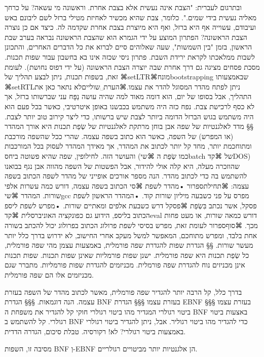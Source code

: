 {ובתרגום לעברית: "הצבת אינה נעשית אלא בצבת אחרת. וראשונה מי עשאה? על כרחך מאליה נעשית בידי שמים.". כלומר, צבת שהיא מכשיר לאחיזת מטילי ברזל לשם ליבונם באש ועיבודם, עשוייה אף היא ברזל, ואף היא מיוצרת בצבת אחרת שקדמה לה. כיצד אם כן נוצרה הצבת הראשונה?
הפתרון המוצע על ידי הגמרא הוא שהצבת הראשונה נבראה בערב שבת הראשון, בזמן "בין השמשות", שעה שאלוהים סיים לברוא את כל הדברים האחרים, והתכונן לשבות ממלאכתו לקראת ירידת השבת. 
פתרון ניסי שכזה אינו בא בחשבון עבור שפות תכנות. מסכת פסחים מציגה גם דרך אחרת שבה יוצרה הצבת הראשונה (על ידי דפוס נחושת). לעומת זאת, בשפות תכנות, ניתן לבצע תהליך של ⌘setLTR{⌘מונח{bootstrapping}} שבאמצעותו ⌘setRTL{ניתן} לפתח מהדר המסוגל להדר את עצמו.⌘הערת␣שוליים{לא נתאר כאן את התהליך, אבל בסופו של יום, הוא דומה מאוד למה שהיה עושה נַפָּח עני שברשותו ברזל, אך לא כסף לרכישת צבת. נפח כזה היה משתמש בכבשנו באופן איטרטיבי, כאשר בכל פעם הוא היה משתמש בגוש הברזל הדומה ביותר לצבת שיש ברשותו, כדי ליצר קירוב טוב יותר לצבת.}
§§ מדד לאלגנטיות של שפה
אבן בוחן מרתקת לאלגנטיות של שְׂפַת תכנות היא אורך המהדר (או המפרש) של השפה, כאשר הוא כתוב בשפה עצמה. שהרי ככל שהשפה מורכבת ומתוחכמת יותר, מחד קל יותר לכתוב את המהדר, אך מאידך המהדר לעסוק בכל המורכבות והעושר הזה. 
לחילופין, שפה שהיא פשוטה ביחס (כמו שְׂפַת ה ⌘שי{batch} של ⌘קד{DOS}) שהוזכרה מעלה, היא קלה אולי להידור, אבל הפשטות של השפה מהווה אבן נגף בבואנו להשתמש בה כדי לכתוב מהדר.
הנה מספר אורכים אופייני של מהדר לשפה הכתוב בשפה עצמה:
⌘תחילת{ספרור}
•מהדר לשפת ⌘סי הכתוב בשפה עצמה, דורש כמה עשרות אלפי שורות. המהדר ⌘שי{gcc} מפרס על פני כשבעה מיליון שורות קוד. 
•המהדר הראשון לשפת פסקל, אשר נכתב בִּשְׂפַת ⌘פסקל דרש כשבעת אלפים ומאתיים שורות.
•מפרש לשפת ליספ הכתוב בליספ, הידוע גם כפונקציה האוניברסלית ⌘קד{eval} דורש כמאה שורות, או מעט פחות מכך. 
⌘סוף{ספרור}
לעומת זאת, מפרש בסיסי לשפת פרולוג הכתוב בפרולוג יכול להכתב בשורה אחת בלבד, ומפרש מתוחכם, המאפשר למשל מעקב אחרי החישוב, לא ידרוש בדרך כלל יותר מעשר שורות.
​§§​ הגדרת שפות להגדרת שפה פורמלית, באמצעות עצמן
מהי שפה פורמלית, כל שְׂפַת תכנות היא שפה פורמלית. ישנן שפות פורמליות שאינן שפות תכנות.
שפות תכנות אינן מכניזים נוח להגדרת שפה פורמלית. 
מכניזמים להגדרת שפות פורמליות. מתברר שגם מכניזמים אלו הם שפה פורמלית.

בדרך כלל, קל הרבה יותר להגדיר שפה פורמלית, מאשר לכתוב מהדר של השפה בעזרת עצמה. 
הנה דוגמאות. 
​§§§ הגדרת BNF בעזרת עצמו
​§§§ הגדרת EBNF בעזרת עצמו
​§§§ ביטוי רגולרי המגדיר מהו ביטוי רגולרי חוקי
קל להגדיר את משפחת ה BNF באצעות ביטוי רגולרי.
קל להשתמש ב BNF כדי להגדיר מהו ביטוי רגוליר.
אבל, ניתן להגדיר ביטוי רגולרי באמצעות ביטוי רגולרי? לא! רקורסיה.
טבלת סיכום, הגדרה הדדית.

מסיבה זו, השפות BNF וְ-EBNF הן אלגנטיות יותר מביטויים רגולריים.

}
